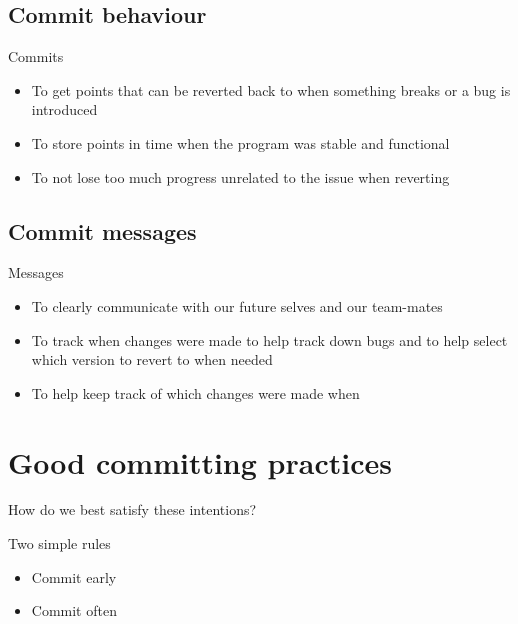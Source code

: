 \subsection{Commit behaviour}
\begin{frame}
\begin{block}{Commits}
  \begin{itemize}
      \item To get points that can be reverted back to when something breaks or a bug is introduced
      \pause
      \item To store points in time when the program was stable and functional
      \pause
      \item To not lose too much progress unrelated to the issue when reverting
  \end{itemize}
\end{block}
\end{frame}

\subsection{Commit messages}

\begin{frame}
\begin{block}{Messages}
  \begin{itemize}
      \item To clearly communicate with our future selves and our team-mates
      \pause
      \item To track when changes were made to help track down bugs and to help select which version to revert to when needed
      \pause
      \item To help keep track of which changes were made when
  \end{itemize}
\end{block}
\end{frame}

\section{Good committing practices}
\begin{frame}
\begin{question}
    How do we best satisfy these intentions?
\end{question}
\pause
\begin{block}{Two simple rules}
    \begin{itemize}
        \item Commit early
        \item Commit often
    \end{itemize}
\end{block}
\end{frame}


